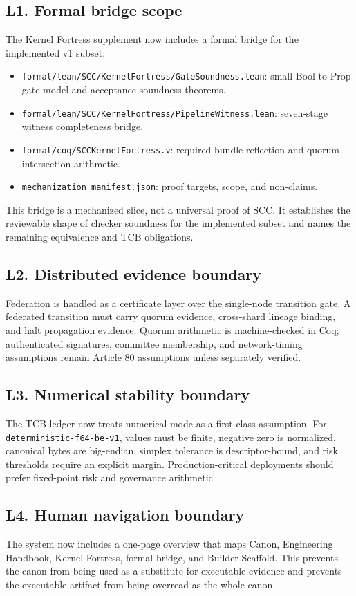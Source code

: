 \documentclass[10pt,oneside]{article}
\theoremstyle{definition}
\theoremstyle{remark}
\begin{document}
\subsection*{L1. Formal bridge scope}
The Kernel Fortress supplement now includes a formal bridge for the implemented v1 subset:
\begin{itemize}
  \item \texttt{formal/lean/SCC/KernelFortress/GateSoundness.lean}: small Bool-to-Prop gate model and acceptance soundness theorems.
  \item \texttt{formal/lean/SCC/KernelFortress/PipelineWitness.lean}: seven-stage witness completeness bridge.
  \item \texttt{formal/coq/SCCKernelFortress.v}: required-bundle reflection and quorum-intersection arithmetic.
  \item \texttt{mechanization\_manifest.json}: proof targets, scope, and non-claims.
\end{itemize}
This bridge is a mechanized slice, not a universal proof of SCC. It establishes the reviewable shape of checker soundness for the implemented subset and names the remaining equivalence and TCB obligations.

\subsection*{L2. Distributed evidence boundary}
Federation is handled as a certificate layer over the single-node transition gate. A federated transition must carry quorum evidence, cross-shard lineage binding, and halt propagation evidence. Quorum arithmetic is machine-checked in Coq; authenticated signatures, committee membership, and network-timing assumptions remain Article 80 assumptions unless separately verified.

\subsection*{L3. Numerical stability boundary}
The TCB ledger now treats numerical mode as a first-class assumption. For \texttt{deterministic-f64-be-v1}, values must be finite, negative zero is normalized, canonical bytes are big-endian, simplex tolerance is descriptor-bound, and risk thresholds require an explicit margin. Production-critical deployments should prefer fixed-point risk and governance arithmetic.

\subsection*{L4. Human navigation boundary}
The system now includes a one-page overview that maps Canon, Engineering Handbook, Kernel Fortress, formal bridge, and Builder Scaffold. This prevents the canon from being used as a substitute for executable evidence and prevents the executable artifact from being overread as the whole canon.
\end{document}
